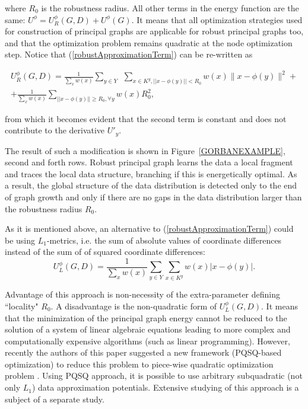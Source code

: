 \documentclass[graybox]{archivesofdatascience}
\begin{document}
\noindent where $R_0$ is the robustness radius. All other terms in the energy function are the same: $U^{\phi}=U^{\phi}_R(G,D)+U^{\phi}{(G)}$. 
It means that all optimization strategies used for construction of principal graphs are applicable for robust principal graphs too,
and that the optimization problem remains quadratic at the node optimization step. Notice that (\ref{robustApproximationTerm}) can be re-written as

\begin{eqnarray}\label{robustApproximationTerm2}
U^{\phi}_R(G,D)= \frac{1}{\sum_{x} w(x)}\sum_{y \in Y} ~~ \sum_{x \in K^y, ||x-\phi(y)||<R_0} w(x) \|x-
\phi(y)\|^2 + \\ + \frac{1}{\sum_{x} w(x)} \sum_{||x-\phi(y)||\geq R_0, \forall y} w(x)R_0^2, \nonumber
\end{eqnarray}

\noindent from which it becomes evident that the second term is constant and does not contribute to the derivative $U'_{y}$.




The result of such a modification is shown in Figure~\ref{GORBANEXAMPLE}, second and forth rows. Robust principal graph learns the data a local fragment and traces the local data structure, branching if this is energetically optimal. As a result, the global structure of the data distribution is detected only to the end of graph growth and only if there are no gaps in the data distribution larger than the robustness radius $R_0$.





\iffalse

As it is mentioned above, an alternative to (\ref{robustApproximationTerm}) could be using $L_1$-metrics, i.e. the sum of absolute values of coordinate differences instead of the sum of of squared coordinate differences:
\begin{equation}
U^{\phi}_L(G,D)= \frac{1}{\sum_{x} w(x)}\sum_{y \in Y} \sum_{ x \in K^y} w(x) |x-
\phi(y)|.
\end{equation}

Advantage of this approach is non-necessity of the extra-parameter defining ``locality" $R_0$. A disadvantage is the non-quadratic form of $U^{\phi}_L(G,D)$. It means that the minimization of the principal graph energy cannot be reduced to the solution of a system of linear algebraic equations leading to more complex and computationally expensive algorithms (such as linear programming). However, recently the authors of this paper suggested a new framework (PQSQ-based optimization) to reduce this problem to piece-wise quadratic optimization problem \citep{Gorban2016NeuralNetworks}. Using PQSQ approach, it is possible to use arbitrary subquadratic (not only $L_1$) data approximation potentials. Extensive studying of this approach is a subject of a separate study.
\end{document}
